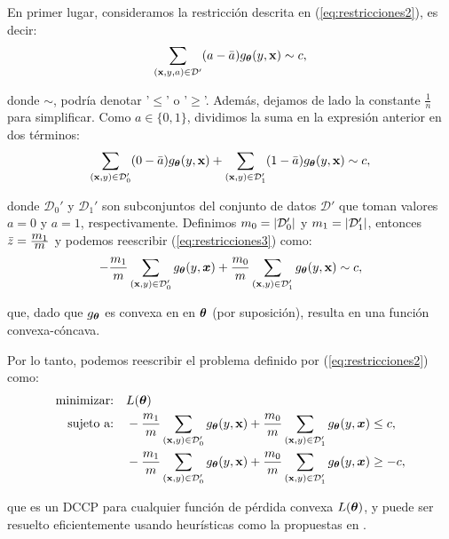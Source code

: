 \documentclass[oneside,openright,titlepage,numbers=noenddot,openany,headinclude,footinclude=true,
cleardoublepage=empty,abstractoff,BCOR=5mm,paper=a4,fontsize=12pt,main=spanish]{scrreprt}
\begin{document}
En primer lugar, consideramos la restricción descrita en (\ref{eq:restricciones2}), es decir:
\begin{equation*}
\sum_{(\textbf{x},y,a)\in \mathcal{D}'} (a-\bar{a})g_{\bm{\theta}} (y,\textbf{x}) \sim c,
\end{equation*}

donde $\sim$, podría denotar '$\leq$' o '$\geq$'. Además, dejamos de lado la constante $\frac{1}{n}$ para simplificar. Como $a \in \{0,1\}$, dividimos la suma en la expresión anterior en dos términos:
\begin{equation} \label{eq:restricciones3}
\sum_{(\textbf{x},y)\in \mathcal{D}_0'} (0-\bar{a})g_{\bm{\theta}} (y,\textbf{x})+\sum_{(\textbf{x},y)\in \mathcal{D}_1'} (1-\bar{a})g_{\bm{\theta}} (y,\textbf{x}) \sim c,
\end{equation}

donde $\mathcal{D}_0'$ y $\mathcal{D}_1'$ son subconjuntos del conjunto de datos $\mathcal{D'}$ que toman valores $a=0$ y $a=1$, respectivamente. Definimos $m_0=\left\lvert\mathcal{D}_0'\right\rvert$ y $m_1=\left\lvert\mathcal{D}_1'\right\rvert$, entonces $\bar{z}=\frac{\displaystyle m_1}{\displaystyle m}$ y podemos reescribir (\ref{eq:restricciones3}) como:
\begin{equation*}
-\frac{\displaystyle m_1}{\displaystyle m} \sum_{(\textbf{x},y)\in \mathcal{D}_0'} g_{\bm{\theta}} (y,\bm{x})+\frac{\displaystyle m_0}{\displaystyle m} \sum_{(\textbf{x},y)\in \mathcal{D}_1'} g_{\bm{\theta}} (y,\textbf{x}) \sim c,
\end{equation*}

que, dado que $g_{\bm{\theta}}$ es convexa en en $\bm{\theta}$ (por suposición), resulta en una función convexa-cóncava. 

Por lo tanto, podemos reescribir el problema definido por (\ref{eq:restricciones2}) como:
\begin{equation*}
\begin{split}
\text{minimizar:} &\quad L(\bm{\theta})\\
\text{sujeto a:} &\quad
-\frac{m_1}{m} \sum_{(\textbf{x},y)\in \mathcal D_0'} g_{\bm{\theta}}(y,\textbf{x}) +\frac{m_0}{m} \sum_{(\textbf{x},y)\in \mathcal D_1'} g_{\bm{\theta}}(y,\bm{x}) \leq c,\\
&\quad -\frac{m_1}{m} \sum_{(\textbf{x},y)\in \mathcal D_0'} g_{\bm{\theta}}(y,\textbf{x})+\frac{m_0}{m} \sum_{(\textbf{x},y)\in \mathcal D_1'} g_{\bm{\theta}}(y,\bm{x}) \geq -c,
\end{split}
\end{equation*}

que es un DCCP para cualquier función de pérdida convexa $L(\bm{\theta})$, y puede ser resuelto eficientemente usando heurísticas como la propuestas en \cite{convex2016}. 
\end{document}
